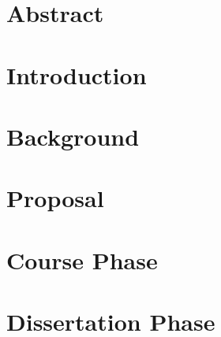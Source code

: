
\section*{Abstract}



\section{Introduction}



\section{Background}



\section{Proposal}



\section{Course Phase}



\section{Dissertation Phase}

